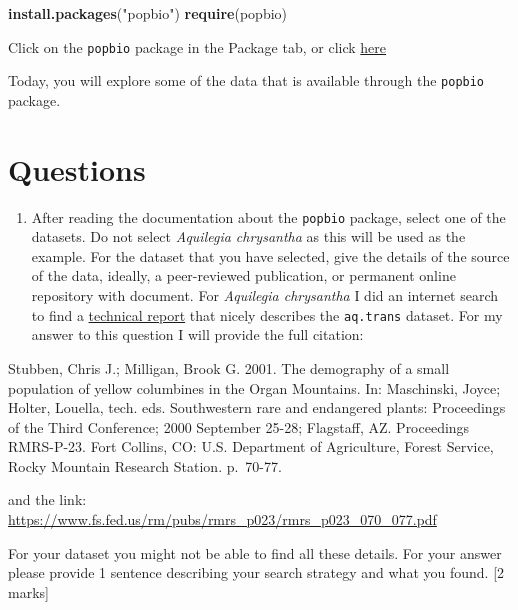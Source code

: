 \documentclass[]{book}
\newenvironment{Shaded}{\begin{snugshade}}{\end{snugshade}}
\newcommand{\KeywordTok}[1]{\textcolor[rgb]{0.13,0.29,0.53}{\textbf{{#1}}}}
\newcommand{\StringTok}[1]{\textcolor[rgb]{0.31,0.60,0.02}{{#1}}}
\newcommand{\NormalTok}[1]{{#1}}
\providecommand{\tightlist}{%
  \setlength{\itemsep}{0pt}\setlength{\parskip}{0pt}}
\begin{document}
\begin{Shaded}
\begin{Highlighting}[]
\KeywordTok{install.packages}\NormalTok{(}\StringTok{"popbio"}\NormalTok{)}
\KeywordTok{require}\NormalTok{(popbio)}
\end{Highlighting}
\end{Shaded}

Click on the \texttt{popbio} package in the Package tab, or click
\href{https://cran.r-project.org/web/packages/popbio/popbio.pdf}{here}

Today, you will explore some of the data that is available through the
\texttt{popbio} package.

\section{Questions}\label{questions}

\begin{enumerate}
\def\labelenumi{\arabic{enumi}.}
\tightlist
\item
  After reading the documentation about the \texttt{popbio} package,
  select one of the datasets. Do not select \emph{Aquilegia chrysantha}
  as this will be used as the example. For the dataset that you have
  selected, give the details of the source of the data, ideally, a
  peer-reviewed publication, or permanent online repository with
  document. For \emph{Aquilegia chrysantha} I did an internet search to
  find a
  \href{https://www.fs.fed.us/rm/pubs/rmrs_p023/rmrs_p023_070_077.pdf}{technical
  report} that nicely describes the \texttt{aq.trans} dataset. For my
  answer to this question I will provide the full citation:
\end{enumerate}

Stubben, Chris J.; Milligan, Brook G. 2001. The demography of a small
population of yellow columbines in the Organ Mountains. In: Maschinski,
Joyce; Holter, Louella, tech. eds. Southwestern rare and endangered
plants: Proceedings of the Third Conference; 2000 September 25-28;
Flagstaff, AZ. Proceedings RMRS-P-23. Fort Collins, CO: U.S. Department
of Agriculture, Forest Service, Rocky Mountain Research Station.
p.~70-77.

and the link:
\url{https://www.fs.fed.us/rm/pubs/rmrs_p023/rmrs_p023_070_077.pdf}

For your dataset you might not be able to find all these details. For
your answer please provide 1 sentence describing your search strategy
and what you found. {[}2 marks{]}
\end{document}
